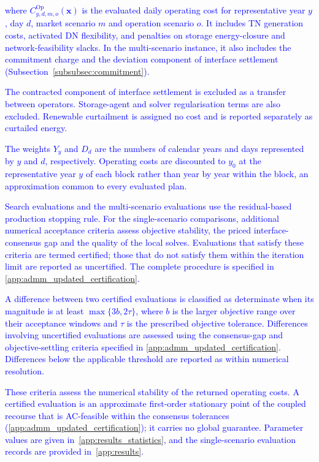 \documentclass[preprint,12pt]{elsarticle}
\begin{document}
\noindent
\textcolor{blue}{
    where 
    $C^{\text{Op}}_{y,d,m,o}(\boldsymbol{x})$ is the evaluated daily operating cost for representative year $y$, day $d$, market scenario $m$ and operation scenario $o$. It includes TN generation costs, activated DN flexibility, and penalties on storage energy-closure and network-feasibility slacks. In the multi-scenario instance, it also includes the commitment charge and the deviation component of interface settlement (Subsection~\ref{subsubsec:commitment}).
}

\textcolor{blue}{
    The contracted component of interface settlement is excluded as a transfer between operators. Storage-agent and solver regularisation terms are also excluded. Renewable curtailment is assigned no cost and is reported separately as curtailed energy.
}

\textcolor{blue}{
    The weights $Y_y$ and $D_d$ are the numbers of calendar years and days represented by $y$ and $d$, respectively. Operating costs are discounted to $y_0$ at the representative year $y$ of each block rather than year by year within the block, an approximation common to every evaluated plan.
}

\textcolor{blue}{
    Search evaluations and the multi-scenario evaluations use the residual-based production stopping rule. 
    For the single-scenario comparisons, additional numerical acceptance criteria assess objective stability, the priced interface-consensus gap and the quality of the local solves.
    Evaluations that satisfy these criteria are termed certified; those that do not satisfy them within the iteration limit are reported as uncertified. 
    The complete procedure is specified in \ref{app:admm_updated_certification}.
}

\textcolor{blue}{
    A difference between two certified evaluations is classified as determinate when its magnitude is at least $\max\{3b,2\tau\}$, where $b$ is the larger objective range over their acceptance windows and $\tau$ is the prescribed objective tolerance. Differences involving uncertified evaluations are assessed using the consensus-gap and objective-settling criteria specified in \ref{app:admm_updated_certification}. Differences below the applicable threshold are reported as within numerical resolution.
}

\textcolor{blue}{
    These criteria assess the numerical stability of the returned operating costs. A certified evaluation is an approximate first-order stationary point of the coupled recourse that is AC-feasible within the consensus tolerances (\ref{app:admm_updated_certification}); it carries no global guarantee.
    Parameter values are given in~\ref{app:results_statistics}, and the single-scenario evaluation records are provided in~\ref{app:results}.
}
\end{document}
